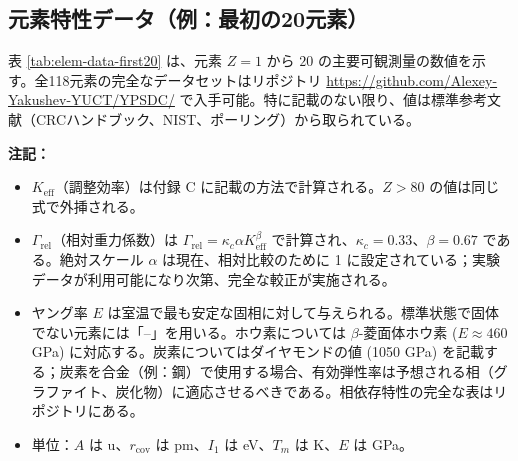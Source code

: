 \documentclass[11pt,a4paper]{article}
\newcommand{\Keff}{K_{\mathrm{eff}}}
\theoremstyle{remark}
\begin{document}
	\subsection{元素特性データ（例：最初の20元素）}
	
	表 \ref{tab:elem-data-first20} は、元素 \(Z=1\) から \(20\) の主要可観測量の数値を示す。全118元素の完全なデータセットはリポジトリ \url{https://github.com/Alexey-Yakushev-YUCT/YPSDC/} で入手可能。特に記載のない限り、値は標準参考文献（CRCハンドブック、NIST、ポーリング）から取られている。
	
	\textbf{注記：}
	\begin{itemize}
		\item \(\Keff\)（調整効率）は付録 C に記載の方法で計算される。\(Z>80\) の値は同じ式で外挿される。
		\item \(\Gamma_{\text{rel}}\)（相対重力係数）は \(\Gamma_{\text{rel}} = \kappa_c \alpha \Keff^{\beta}\) で計算され、\(\kappa_c=0.33\)、\(\beta=0.67\) である。絶対スケール \(\alpha\) は現在、相対比較のために 1 に設定されている；実験データが利用可能になり次第、完全な較正が実施される。
		\item ヤング率 \(E\) は室温で最も安定な固相に対して与えられる。標準状態で固体でない元素には「–」を用いる。ホウ素については \(\beta\)-菱面体ホウ素 (\(E \approx 460\) GPa) に対応する。炭素についてはダイヤモンドの値 (1050 GPa) を記載する；炭素を合金（例：鋼）で使用する場合、有効弾性率は予想される相（グラファイト、炭化物）に適応させるべきである。相依存特性の完全な表はリポジトリにある。
		\item 単位：\(A\) は u、\(r_{\text{cov}}\) は pm、\(I_1\) は eV、\(T_m\) は K、\(E\) は GPa。
	\end{itemize}
	
\end{document}
